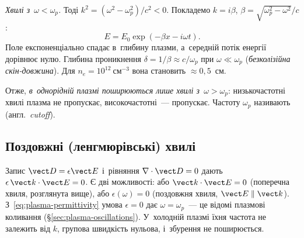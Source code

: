 \emph{Хвилі з~$\omega<\omega_p$.} Тоді $k^2=(\omega^2-\omega_p^2)/c^2<0$. Покладемо
$k=i\beta$, $\beta=\sqrt{\omega_p^2-\omega^2}/c$:
\begin{equation*}
	E=E_0\exp(-\beta x-i\omega t).
\end{equation*}
Поле експоненціально спадає в~глибину плазми, а~середній потік енергії дорівнює нулю.
Глибина проникнення $\delta=1/\beta\approx c/\omega_p$ при $\omega\ll\omega_p$
(\emph{безколізійна скін-довжина}). Для $n_e=10^{12}~\mathrm{см}^{-3}$ вона становить
$\approx0{,}5$~см.

Отже, \emph{в~однорідній плазмі поширюються лише хвилі з~$\omega>\omega_p$}:
низькочастотні хвилі плазма не пропускає, високочастотні~--- пропускає. Частоту $\omega_p$
називають  (англ.~\emph{cutoff}).


\subsection*{Поздовжні (ленгмюрівські) хвилі}\label{sec:langmuir-waves}


Запис $\vect D=\epsilon\vect E$ і~рівняння $\nabla\cdot\vect D=0$ дають
$\epsilon\,\vect k\cdot\vect E=0$. Є дві можливості: або $\vect k\cdot\vect E=0$
(поперечна хвиля, розглянута вище), або $\epsilon(\omega)=0$ (поздовжня хвиля, $\vect
	E\parallel\vect k$). З~\eqref{eq:plasma-permittivity} умова $\epsilon=0$ дає
$\omega=\omega_p$~--- це відомі плазмові коливання (§\ref{sec:plasma-oscillations}).
У~холодній плазмі їхня частота не залежить від $k$, групова швидкість нульова, і~збурення
не поширюється.

